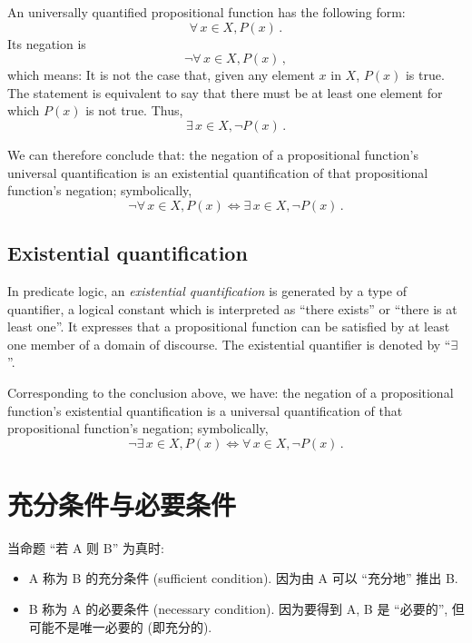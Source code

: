 \documentclass{book}
\newcommand{\bideduce}{\Longleftrightarrow}
\newcommand{\Exists}{\exists\,}
\newcommand{\Any}{\forall\,}
\numberwithin{equation}{section}
\numberwithin{figure}{section}
\theoremstyle{definition}
\newcommand{\dq}[1]{``#1''}
\begin{document}
An universally quantified propositional function has the following form:
\begin{equation*}
  \Any x\in X,P(x)\,.
\end{equation*}
Its negation is
\begin{equation*}
  \neg\Any x\in X,P(x)\,,
\end{equation*}
which means: It is not the case that, given any element $x$ in $X$, $P(x)$ is true. The statement is equivalent to say that there must be at least one element for which $P(x)$ is not true. Thus,
\begin{equation*}
  \Exists x\in X,\neg P(x)\,.
\end{equation*}

We can therefore conclude that: the negation of a propositional function's universal quantification is an existential quantification of that propositional function's negation; symbolically,
\begin{equation*}
  \neg\Any x\in X, P(x) \bideduce \Exists x\in X, \neg P(x)\,.
\end{equation*}

\subsection{Existential quantification}
In predicate logic, an \emph{existential quantification} is generated by a type of quantifier, a logical constant which is interpreted as ``there exists'' or ``there is at least one''. It expresses that a propositional function can be satisfied by at least one member of a domain of discourse.
The existential quantifier is denoted by ``$\exists$''.

Corresponding to the conclusion above, we have: the negation of a propositional function's existential quantification is a universal quantification of that propositional function's negation; symbolically,
\begin{equation*}
  \neg\Exists x\in X, P(x) \bideduce \Any x\in X, \neg P(x)\,.
\end{equation*}

\section{充分条件与必要条件}
当命题 \dq{若 A 则 B} 为真时:
\begin{itemize}
  \item A 称为 B 的充分条件 (sufficient condition). 因为由 A 可以 \dq{充分地} 推出 B.
  \item B 称为 A 的必要条件 (necessary condition). 因为要得到 A, B 是 \dq{必要的}, 但可能不是唯一必要的 (即充分的).
\end{itemize}
\end{document}
